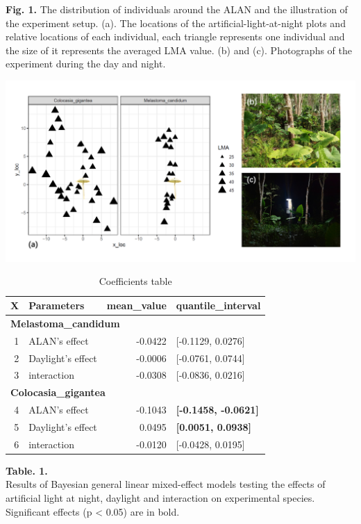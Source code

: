 \documentclass[
]{article}
\begin{document}
\newpage

\textbf{Fig. 1.} The distribution of individuals around the ALAN and the
illustration of the experiment setup. (a). The locations of the
artificial-light-at-night plots and relative locations of each
individual, each triangle represents one individual and the size of it
represents the averaged LMA value. (b) and (c). Photographs of the
experiment during the day and night.

\includegraphics{../figs/LMA_distribution}

\newpage

\begin{table}

\caption{\label{tab:table}Coefficients table}
\centering
\begin{tabular}[t]{r|l|r|>{}l}
\hline
X & Parameters & mean\_value & quantile\_interval\\
\hline
\multicolumn{4}{l}{\textbf{Melastoma\_candidum}}\\
\hline
\hspace{1em}1 & ALAN's effect & -0.0422 & [-0.1129, 0.0276]\\
\hline
\hspace{1em}2 & Daylight's effect & -0.0006 & [-0.0761, 0.0744]\\
\hline
\hspace{1em}3 & interaction & -0.0308 & [-0.0836, 0.0216]\\
\hline
\multicolumn{4}{l}{\textbf{Colocasia\_gigantea}}\\
\hline
\hspace{1em}4 & ALAN's effect & -0.1043 & \textbf{[-0.1458, -0.0621]}\\
\hline
\hspace{1em}5 & Daylight's effect & 0.0495 & \textbf{[0.0051, 0.0938]}\\
\hline
\hspace{1em}6 & interaction & -0.0120 & [-0.0428, 0.0195]\\
\hline
\end{tabular}
\end{table}

\textbf{Table. 1.}\\
Results of Bayesian general linear mixed-effect models testing the
effects of artificial light at night, daylight and interaction on
experimental species. Significant effects (p \textless{} 0.05) are in
bold.

\newpage
\end{document}

